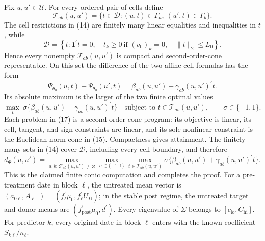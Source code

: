 Fix \(u,u'\in\mathcal U\).  For every ordered pair of cells define
\[
 \mathcal T_{ab}(u,u')
 =\{t\in\mathcal D:(u,t)\in\Gamma_a,\ (u',t)\in\Gamma_b\}.
\tag{14}
\]
The cell restrictions in (14) are finitely many linear equalities and inequalities in \(t\), while
\[
 \mathcal D=\left\{t:\mathbf 1^{\prime}t=0,\quad
 t_k\geq0\ \text{if }(v_0)_k=0,\quad
 \lVert t\rVert_2\leq L_0\right\}.
\tag{15}
\]
Hence every nonempty \(\mathcal T_{ab}(u,u')\) is compact and second-order-cone representable.  On this set the difference of the two affine cell formulas has the form
\[
 \Psi_{\theta_0}(u,t)-\Psi_{\theta_0}(u',t)
 =\beta_{ab}(u,u')+\gamma_{ab}(u,u')^{\prime}t.
\tag{16}
\]
Its absolute maximum is the larger of the two finite optimal values
\[
 \max_{t}\ \sigma\{\beta_{ab}(u,u')+\gamma_{ab}(u,u')^{\prime}t\}
 \quad\text{subject to }t\in\mathcal T_{ab}(u,u'),
 \qquad \sigma\in\{-1,1\}.
\tag{17}
\]
Each problem in (17) is a second-order-cone program: its objective is linear, its cell, tangent, and sign constraints are linear, and its sole nonlinear constraint is the Euclidean-norm cone in (15).  Compactness gives attainment.  The finitely many sets in (14) cover \(\mathcal D\), including every cell boundary, and therefore
\[
 d_\Psi(u,u')
 =\max_{a,b:\,\mathcal T_{ab}(u,u')\ne\varnothing}
   \max_{\sigma\in\{-1,1\}}
   \max_{t\in\mathcal T_{ab}(u,u')}
   \sigma\{\beta_{ab}(u,u')+\gamma_{ab}(u,u')^{\prime}t\}.
\tag{18}
\]
This is the claimed finite conic computation and completes the proof.
For a pre-treatment date in block \(\ell\), the untreated mean vector is \((a_{0\ell},A_{\ell\cdot})=(f_\ell^{\prime}\mu_0,f_\ell^{\prime}U_D)\); in the stable post regime, the untreated target and donor means are \((f_{\mathrm{post}}^{\prime}\mu_0,d^{\prime})\).
Every eigenvalue of \(\Sigma\) belongs to \([c_{\mathrm{lo}},C_{\mathrm{hi}}]\).
For predictor \(k\), every original date in block \(\ell\) enters with the known coefficient \(S_{k\ell}/n_\ell\).
